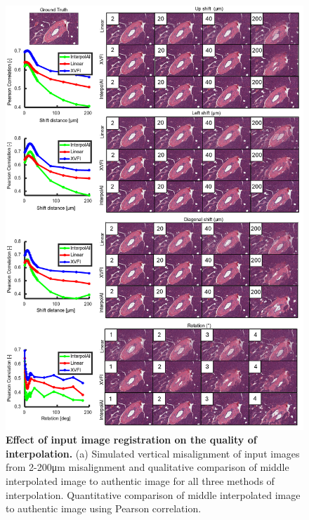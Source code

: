 \begin{refsection}
    \begin{figure}[p] 
      \centering
      \includegraphics[width=\linewidth,                   height=0.85\textheight,                   keepaspectratio]{figures/chapter6/fig_S1.png}
      \captionsetup{font=small}
      \caption{\textbf{Effect of input image registration on the quality of interpolation.} (a) Simulated vertical misalignment of input images from 2-200μm misalignment and qualitative comparison of middle interpolated image to authentic image for all three methods of interpolation. Quantitative comparison of middle interpolated image to authentic image using Pearson correlation. }
      \label{chapter6_figS1}
    \end{figure}
    

\end{refsection}
